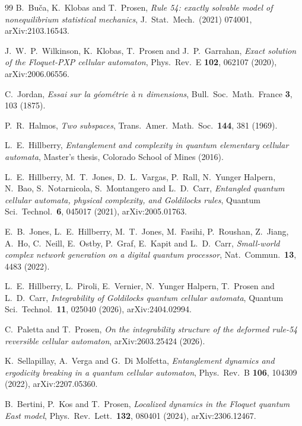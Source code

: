 \begin{thebibliography}{99}
 B.~Bu\v{c}a, K.~Klobas and T.~Prosen,
  \emph{Rule 54: exactly solvable model of nonequilibrium statistical
  mechanics}, J.\ Stat.\ Mech.\ (2021) 074001, arXiv:2103.16543.

 J.~W.~P.~Wilkinson, K.~Klobas, T.~Prosen and
  J.~P.~Garrahan, \emph{Exact solution of the Floquet-PXP cellular automaton},
  Phys.\ Rev.\ E \textbf{102}, 062107 (2020), arXiv:2006.06556.

 C.~Jordan, \emph{Essai sur la g\'eom\'etrie \`a $n$
  dimensions}, Bull.\ Soc.\ Math.\ France \textbf{3}, 103 (1875).

 P.~R.~Halmos, \emph{Two subspaces},
  Trans.\ Amer.\ Math.\ Soc.\ \textbf{144}, 381 (1969).


 L.~E.~Hillberry, \emph{Entanglement and complexity in quantum elementary cellular
  automata}, Master's thesis, Colorado School of Mines (2016).

 L.~E.~Hillberry, M.~T.~Jones, D.~L.~Vargas, P.~Rall, N.~Yunger Halpern, N.~Bao,
  S.~Notarnicola, S.~Montangero and L.~D.~Carr, \emph{Entangled quantum cellular automata, physical complexity,
  and Goldilocks rules}, Quantum Sci.\ Technol.\ \textbf{6}, 045017 (2021), arXiv:2005.01763.

 E.~B.~Jones, L.~E.~Hillberry, M.~T.~Jones, M.~Fasihi, P.~Roushan, Z.~Jiang, A.~Ho, C.~Neill,
  E.~Ostby, P.~Graf, E.~Kapit and L.~D.~Carr, \emph{Small-world complex network generation on a digital quantum
  processor}, Nat.\ Commun.\ \textbf{13}, 4483 (2022).

 L.~E.~Hillberry, L.~Piroli, E.~Vernier, N.~Yunger Halpern, T.~Prosen and L.~D.~Carr,
  \emph{Integrability of Goldilocks quantum cellular automata}, Quantum Sci.\ Technol.\ \textbf{11}, 025040 (2026),
  arXiv:2404.02994.

 C.~Paletta and T.~Prosen, \emph{On the integrability structure of the deformed rule-54
  reversible cellular automaton}, arXiv:2603.25424 (2026).

 K.~Sellapillay, A.~Verga and G.~Di Molfetta, \emph{Entanglement dynamics and ergodicity
  breaking in a quantum cellular automaton}, Phys.\ Rev.\ B \textbf{106}, 104309 (2022), arXiv:2207.05360.

 B.~Bertini, P.~Kos and T.~Prosen, \emph{Localized dynamics in the Floquet quantum East
  model}, Phys.\ Rev.\ Lett.\ \textbf{132}, 080401 (2024), arXiv:2306.12467.



\end{thebibliography}
